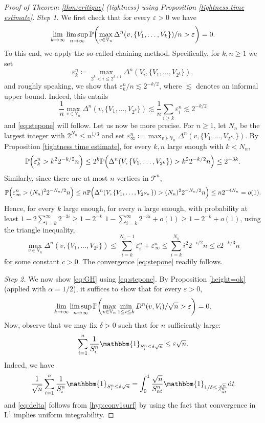 \documentclass[11pt]{article}
\theoremstyle{plain}
\theoremstyle{definition}
\theoremstyle{remark}
\newcommand{\1}{\mathbbm{1}} %
\newcommand{\proba}[1]{\mathbb{P}\left(#1\right)} %
\newcommand{\e}{\varepsilon} %
\newcommand{\T}{\mathcal{T}} %
\newcommand{\V}{\mathbb{V}} %
\newcommand{\dc}{D} %
\let\originalleft\left
\let\originalright\right
\renewcommand{\left}{\mathopen{}\mathclose\bgroup\originalleft}
\renewcommand{\right}{\aftergroup\egroup\originalright}
\begin{document}
\begin{proof}[Proof of Theorem \ref{thm:critique} (tightness) using Proposition \ref{tightness time estimate}]
\emph{Step 1.} We first check that for every $\e>0$ we have
\begin{equation}
\label{eq:stepone}\lim_{k\to \infty} \limsup_{n\to \infty} \proba{\max_{v\in \V_{n}} \Delta^n(v,\{V_1,\dots, V_k\})/n>\e}=0.
\end{equation}
To this end, we apply the so-called chaining method. Specifically,  for $k, n \geq 1$ we set
\[ \e^n_k \coloneqq   \max_{2^k<i\leq 2^{k+1}} \Delta^n(V_i,\{V_1,\dots, V_{2^k}\}),
\]
and roughly speaking, we show that $ \e^n_k/n\lesssim 2^{-k/2}$, where $\lesssim$ denotes an informal upper bound. Indeed, this entails
\[  \frac{1}{n}\max_{v\in \V_{n}} \Delta^n(v,\{V_1,\dots, V_{2^k}\}) \lesssim  \frac{1}{n}\sum_{i\geq k} \e^n_{i} \lesssim 2^{-k/2}\]
and \eqref{eq:stepone} will follow. Let us now be more precise. For $n \geq 1$, let $N_n$ be the largest integer with $2^{N_n}\leq n^{1/3}$  and set $\e^n_{\infty}\coloneqq\max_{v\in \V_{n}} \Delta^n(v,\{V_1,\dots, V_{2^{N_n}}\})$. By Proposition \ref{tightness time estimate}, for every $k,n$ large enough with $k< N_n$, 
\[ \proba{\e^n_k >k^2 2^{-k/2}n} \leq 2^k\proba{ \Delta^n(V,\{V_1,\dots, V_{2^k}\}) >k^2 2^{-k/2} n }\leq 2^{-3k}.\]
Similarly, since there are at most $n$ vertices in $\T^n$,
\[ \proba{\e^n_\infty >(N_n)^2 2^{-N_n/2}n} \leq n \proba{ \Delta^n(V,\{V_1,\dots, V_{2^{N_n}}\}) >(N_n)^2 2^{-N_n/2}n  }\leq n 2^{-4N_n}=o(1).\]
Hence, for every $k$ large enough, for every $n$ large enough, with probability at least {
\sout{$1-2\sum_{i=k}^\infty 2^{-3i}\geq 1-2^{-k}$} $1-\sum_{i=k}^\infty 2^{-3i}+o(1) \geq 1-2^{-k}+o(1)$, using the triangle inequality,} 
\[ \max_{v\in \V_{n}} \Delta^n(v,\{V_1,\dots, V_{2^k}\}) \leq \sum_{i=k}^{N_n-1} \e^n_i +\e^n_\infty \leq \sum_{i=k}^{N_n} i^2 2^{-i/2}n\leq c 2^{-k/3} n\]
{for some constant $c>0$.}
The convergence \eqref{eq:stepone} readily follows. 


\emph{Step 2.} We now show \eqref{eq:GH}  using \eqref{eq:stepone}. By Proposition \ref{height=ok} (applied with $\alpha=1/2$), it suffices to show that for every $\e>0$,
\begin{equation}
\lim_{k\to \infty} \limsup_{n\to \infty} \proba{\max_{v\in \V_{n}} \min_{1\leq i \leq k} \dc^n(v,V_i)/\sqrt{n}>\e}=0. \label{16/01/11h}
\end{equation}
{Now, observe that we may fix $\delta>0$ such that for $n$ sufficiently large:
\begin{equation}
\label{eq:delta}\sum_{i=1}^n  \frac{1}{S^n_{i}} \mathbbm{1}_{S^n_{i}\leq \delta \sqrt{n}} \leq \e \sqrt{n}.
\end{equation}
Indeed, we have
\[
\frac{1}{\sqrt{n}} \sum_{i=1}^n  \frac{1}{S^n_{i}} \mathbbm{1}_{S^n_{i}\leq \delta \sqrt{n}}=\int_{0}^{1}  \frac{\sqrt{n}}{S^{n}_{nt}} \mathbbm{1}_{1/\delta \leq   \frac{\sqrt{n}}{S^{n}_{nt}}} \mathrm{d}t
\]
and \eqref{eq:delta} follows from  \ref{hyp:conv1surf} by using the fact that convergence in $\mathrm{L}^{1}$ implies uniform integrability.}
 

\end{proof}
\end{document}
